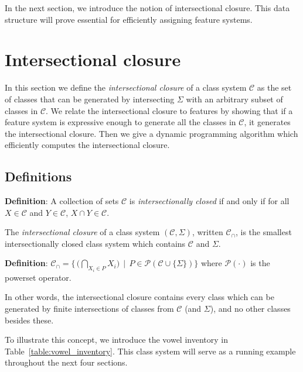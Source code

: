 \documentclass[11pt, oneside]{article}   	%
\begin{document}
\vspace{\baselineskip} In the next section, we introduce the notion of intersectional closure. This data structure will prove essential for efficiently assigning feature systems.

\FloatBarrier
\section{Intersectional closure}
\label{sec:intersectional}

In this section we define the \textit{intersectional closure} of a class system $\mathcal{C}$ as the set of classes that can be generated by intersecting $\Sigma$ with an arbitrary subset of classes in $\mathcal{C}$. We relate the intersectional closure to features by showing that if a feature system is expressive enough to generate all the classes in $\mathcal{C}$, it generates the intersectional closure. Then we give a dynamic programming algorithm which efficiently computes the intersectional closure. 

\subsection{Definitions}

\textbf{Definition}: A collection of sets $\mathcal C$ is \textit{intersectionally closed} if and only if for all $X \in \mathcal C$ and $Y \in \mathcal C$, $X \cap Y \in \mathcal C$.

\vspace{\baselineskip} \noindent The \textit{intersectional closure} of a class system $(\mathcal C, \Sigma)$, written $\mathcal C_\cap$, is the smallest intersectionally closed class system which contains $\mathcal C$ and $\Sigma$.

\vspace{\baselineskip} \noindent \textbf{Definition}: $\mathcal C_\cap = \{ \, \big( \bigcap_{X_i \in P} X_i \big) \, \mid \, P \in \mathcal P(\mathcal C \cup \{ \Sigma \}) \}$ where $\mathcal P(\cdot)$ is the powerset operator. 

\vspace{\baselineskip} \noindent In other words, the intersectional closure contains every class which can be generated by finite intersections of classes from $\mathcal C$ (and $\Sigma$), and no other classes besides these.

To illustrate this concept, we introduce the vowel inventory in Table~\ref{table:vowel_inventory}. This class system will serve as a running example throughout the next four sections.
\end{document}
